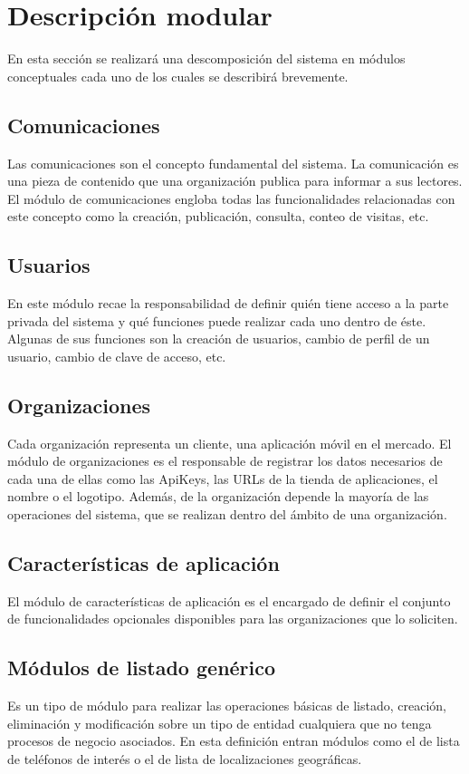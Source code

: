 \section{Descripción modular}
En esta sección se realizará una descomposición del sistema en módulos conceptuales cada uno de los cuales se describirá brevemente.

\subsection*{Comunicaciones}
Las comunicaciones son el concepto fundamental del sistema. La comunicación es una pieza de contenido que una organización publica para informar a sus lectores. El módulo de comunicaciones engloba todas las funcionalidades relacionadas con este concepto como la creación, publicación, consulta, conteo de visitas, etc.

\subsection*{Usuarios}
En este módulo recae la responsabilidad de definir quién tiene acceso a la parte privada del sistema y qué funciones puede realizar cada uno dentro de éste. Algunas de sus funciones son la creación de usuarios, cambio de perfil de un usuario, cambio de clave de acceso, etc.

\subsection*{Organizaciones}
Cada organización representa un cliente, una aplicación móvil en el mercado. El módulo de organizaciones es el responsable de registrar los datos necesarios de cada una de ellas como las ApiKeys, las URLs de la tienda de aplicaciones, el nombre o el logotipo. Además, de la organización depende la mayoría de las operaciones del sistema, que se realizan dentro del ámbito de una organización.

\subsection*{Características de aplicación}
El módulo de características de aplicación es el encargado de definir el conjunto de funcionalidades opcionales disponibles para las organizaciones que lo soliciten.

\subsection*{Módulos de listado genérico}
Es un tipo de módulo para realizar las operaciones básicas de listado, creación, eliminación y modificación sobre un tipo de entidad cualquiera que no tenga procesos de negocio asociados. En esta definición entran módulos como el de lista de teléfonos de interés o el de lista de localizaciones geográficas.

